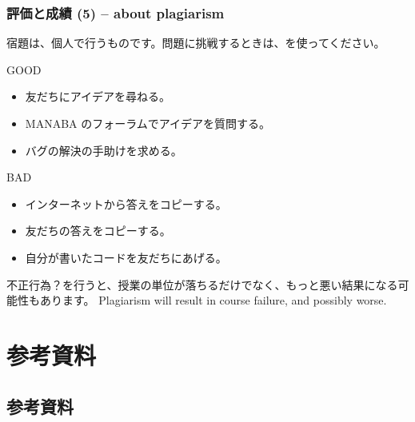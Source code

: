 \documentclass{beamer}
\begin{document}
\begin{frame}
  \frametitle{評価と成績 (5) -- about plagiarism}
  
  宿題は、\alert{個人で行う}ものです。問題に挑戦するときは、を使ってください。

  \begin{exampleblock}{GOOD}
    \begin{itemize}
    \item 友だちにアイデアを尋ねる。
    \item MANABA のフォーラムでアイデアを質問する。
    \item バグの解決の手助けを求める。
    \end{itemize}
  \end{exampleblock}

  \begin{alertblock}{BAD}
    \begin{itemize}
    \item インターネットから答えをコピーする。
    \item 友だちの答えをコピーする。
    \item 自分が書いたコードを友だちにあげる。
    \end{itemize}
  \end{alertblock}

  不正行為？を行うと、授業の単位が落ちるだけでなく、もっと悪い結果になる可能性もあります。
  Plagiarism will result in course failure, and possibly worse.
\end{frame}

\section{参考資料}
\subsection{参考資料}
\end{document}
